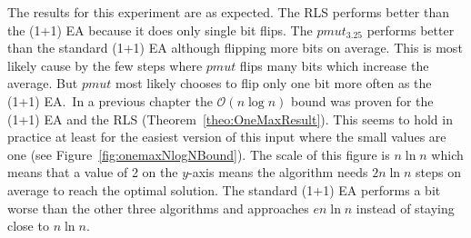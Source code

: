 

The results for this experiment are as expected.
The RLS performs better than the (1+1) EA because it does only single bit flips.
The $pmut_{3.25}$ performs better than the standard (1+1) EA although flipping more bits on average.
This is most likely cause by the few steps where $pmut$ flips many bits which increase the average.
But $pmut$ most likely chooses to flip only one bit more often as the (1+1) EA.\
In a previous chapter the $\mathcal{O}(n\log n)$ bound was proven for the (1+1) EA and the RLS (Theorem~\ref{theo:OneMaxResult}).
This seems to hold in practice at least for the easiest version of this input where the small values are one (see Figure~\ref{fig:onemaxNlogNBound}).
The scale of this figure is $n\ln n$ which means that a value of 2 on the $y$-axis means the algorithm needs $2n\ln n$ steps on average to reach the optimal solution.
The standard (1+1) EA performs a bit worse than the other three algorithms and approaches $en\ln n$ instead of staying close to $n\ln n$.

